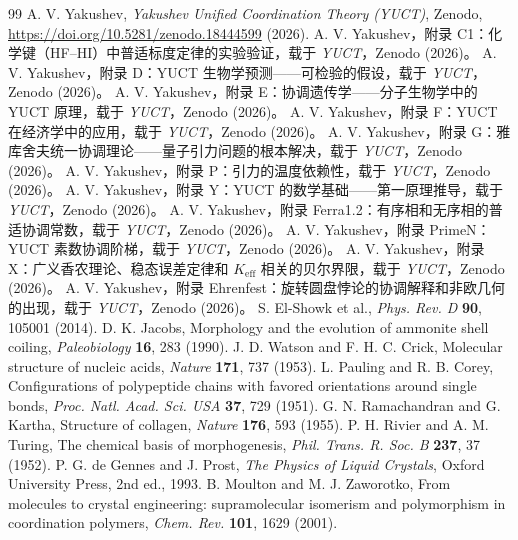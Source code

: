 \documentclass[12pt]{article}
\begin{document}
	\begin{thebibliography}{99}
		A. V. Yakushev, \emph{Yakushev Unified Coordination Theory (YUCT)}, Zenodo, \url{https://doi.org/10.5281/zenodo.18444599} (2026).
		A. V. Yakushev，附录 C1：化学键（HF–HI）中普适标度定律的实验验证，载于 \emph{YUCT}，Zenodo (2026)。
		A. V. Yakushev，附录 D：YUCT 生物学预测——可检验的假设，载于 \emph{YUCT}，Zenodo (2026)。
		A. V. Yakushev，附录 E：协调遗传学——分子生物学中的 YUCT 原理，载于 \emph{YUCT}，Zenodo (2026)。
		A. V. Yakushev，附录 F：YUCT 在经济学中的应用，载于 \emph{YUCT}，Zenodo (2026)。
		A. V. Yakushev，附录 G：雅库舍夫统一协调理论——量子引力问题的根本解决，载于 \emph{YUCT}，Zenodo (2026)。
		A. V. Yakushev，附录 P：引力的温度依赖性，载于 \emph{YUCT}，Zenodo (2026)。
		A. V. Yakushev，附录 Y：YUCT 的数学基础——第一原理推导，载于 \emph{YUCT}，Zenodo (2026)。
		A. V. Yakushev，附录 Ferra1.2：有序相和无序相的普适协调常数，载于 \emph{YUCT}，Zenodo (2026)。
		A. V. Yakushev，附录 PrimeN：YUCT 素数协调阶梯，载于 \emph{YUCT}，Zenodo (2026)。
		A. V. Yakushev，附录 X：广义香农理论、稳态误差定律和 \(K_{\mathrm{eff}}\) 相关的贝尔界限，载于 \emph{YUCT}，Zenodo (2026)。
		A. V. Yakushev，附录 Ehrenfest：旋转圆盘悖论的协调解释和非欧几何的出现，载于 \emph{YUCT}，Zenodo (2026)。
		S. El-Showk et al., \emph{Phys. Rev. D} \textbf{90}, 105001 (2014).
		D. K. Jacobs, Morphology and the evolution of ammonite shell coiling, \emph{Paleobiology} \textbf{16}, 283 (1990).
		J. D. Watson and F. H. C. Crick, Molecular structure of nucleic acids, \emph{Nature} \textbf{171}, 737 (1953).
		L. Pauling and R. B. Corey, Configurations of polypeptide chains with favored orientations around single bonds, \emph{Proc. Natl. Acad. Sci. USA} \textbf{37}, 729 (1951).
		G. N. Ramachandran and G. Kartha, Structure of collagen, \emph{Nature} \textbf{176}, 593 (1955).
		P. H. Rivier and A. M. Turing, The chemical basis of morphogenesis, \emph{Phil. Trans. R. Soc. B} \textbf{237}, 37 (1952).
		P. G. de Gennes and J. Prost, \emph{The Physics of Liquid Crystals}, Oxford University Press, 2nd ed., 1993.
		B. Moulton and M. J. Zaworotko, From molecules to crystal engineering: supramolecular isomerism and polymorphism in coordination polymers, \emph{Chem. Rev.} \textbf{101}, 1629 (2001).

\end{thebibliography}
\end{document}
